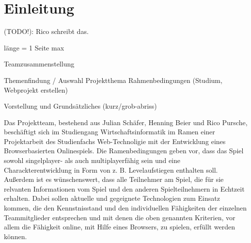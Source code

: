 

\section{Einleitung}

(TODO!): Rico schreibt das.

länge = 1 Seite max

Teamzusammenstellung 

Themenfindung / Auswahl Projektthema
Rahmenbedingungen (Studium, Webprojekt erstellen)

Vorstellung und Grundsätzliches (kurz/grob-abriss)

Das Projektteam, bestehend aus Julian Schäfer, Henning Beier und Rico Pursche, beschäftigt sich im Studiengang Wirtschaftsinformatik im Ramen einer Projektarbeit des Studienfachs Web-Technoligie mit der Entwicklung eines Browserbasierten Onlinespiels. Die Ramenbedingungen geben vor, dass das Spiel sowohl singelplayer- als auch multiplayerfähig sein und eine Charackterentwicklung in Form von z. B. Levelaufstiegen enthalten soll. Außerdem ist es wünschenswert, dass alle Teilnehmer am Spiel, die für sie relvanten Informationen vom Spiel und den anderen Spielteilnehmern in Echtzeit erhalten. Dabei sollen aktuelle und gegeignete Technologien zum Einsatz kommen, die den Kennstnisstand und den individuellen Fähigkeiten der einzelnen Teammitglieder entsprechen und mit denen die oben genannten Kriterien, vor allem die Fähigkeit online, mit Hilfe eines Browsers, zu spielen, erfüllt werden können. 